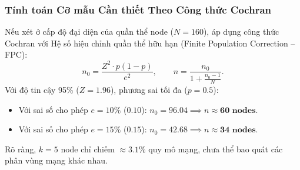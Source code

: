 \documentclass[11pt,a4paper]{article}
\begin{document}
\subsubsection{Tính toán Cỡ mẫu Cần thiết Theo Công thức Cochran}
Nếu xét ở cấp độ đại diện của quần thể node ($N = 160$), áp dụng công thức Cochran với Hệ số hiệu chỉnh quần thể hữu hạn (Finite Population Correction -- FPC):
\begin{equation}
    n_0 = \frac{Z^2 \cdot p(1-p)}{e^2}, \qquad n = \frac{n_0}{1 + \frac{n_0 - 1}{N}}.
\end{equation}
Với độ tin cậy 95\% ($Z=1.96$), phương sai tối đa ($p=0.5$):
\begin{itemize}
    \item Với sai số cho phép $e = 10\%$ ($0.10$): $n_0 = 96.04 \implies n \approx \mathbf{60\text{ nodes}}$.
    \item Với sai số cho phép $e = 15\%$ ($0.15$): $n_0 = 42.68 \implies n \approx \mathbf{34\text{ nodes}}$.
\end{itemize}
Rõ ràng, $k = 5$ node chỉ chiếm $\approx 3.1\%$ quy mô mạng, chưa thể bao quát các phân vùng mạng khác nhau.
\end{document}
